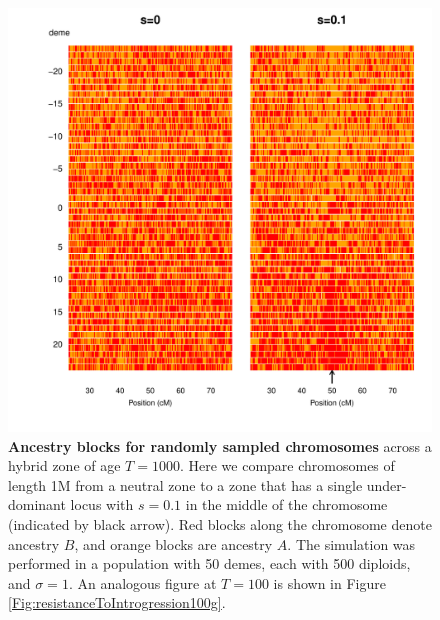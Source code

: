 \documentclass[11pt,letterpaper]{article}
\begin{document}
\begin{figure}
\includegraphics[width=\textwidth]{figs/plot_chromosomes_tau1000_zoomed.pdf}
\caption{
    \textbf{Ancestry blocks for randomly sampled chromosomes} across a hybrid zone of age $T=1000$.  %
    Here we compare chromosomes of length 1M from a neutral zone to a zone that has a single under-dominant locus with $s=0.1$
    in the middle of the chromosome (indicated by black arrow). 
    Red blocks along the chromosome denote ancestry $B$, and orange blocks are ancestry $A$. 
    The simulation was performed in a population with 50 demes, 
    each with 500 diploids, and $\sigma=1$.
    An analogous figure at $T=100$ is shown in Figure \ref{Fig:resistanceToIntrogression100g}.
}\label{Fig:resistanceToIntrogression1000g}
\end{figure}
\end{document}
